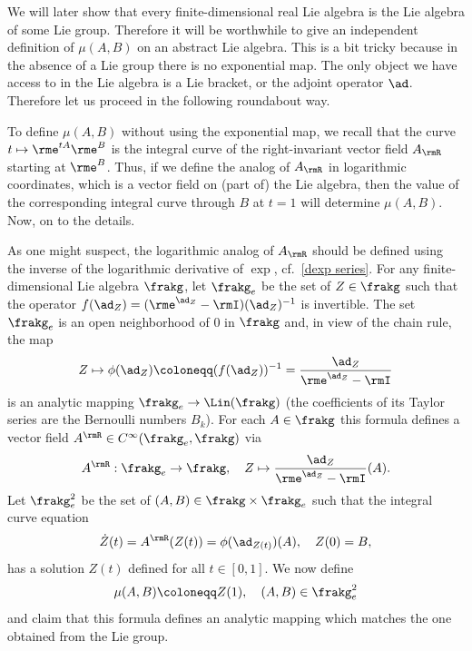 We will later show that every finite-dimensional real Lie algebra is the Lie algebra of some Lie group. Therefore it will be worthwhile to give an independent definition of $\mu(A,B)$ on an abstract Lie algebra. This is a bit tricky because in the absence of a Lie group there is no exponential map. The only object we have access to in the Lie algebra is a Lie bracket, or the adjoint operator $\ad$. Therefore let us proceed in the following roundabout way. 

To define $\mu(A,B)$ without using the exponential map, we recall that the curve $t\mapsto \rme^{tA}\rme^B$ is the integral curve of the right-invariant vector field $A_\rmR$ starting at $\rme^B$. Thus, if we define the analog of $A_\rmR$ in logarithmic coordinates, which is a vector field on (part of) the Lie algebra, then the value of the corresponding integral curve through $B$ at $t=1$ will determine $\mu(A,B)$. Now, on to the details.

As one might suspect, the logarithmic analog of $A_\rmR$ should be defined using the inverse of the logarithmic derivative of $\exp$, cf.\ \ref{dexp series}. For any finite-dimensional Lie algebra $\frakg$, let $\frakg_e$ be the set of $Z\in \frakg$ such that the operator $f(\ad_Z)=(\rme^{\ad_Z}-\rmI)(\ad_Z)^{-1}$ is invertible. The set $\frakg_e$ is an open neighborhood of $0$ in $\frakg$ and, in view of the chain rule, the map
\[Z\mapsto \phi(\ad_Z)\coloneqq (f(\ad_Z))^{-1}=\frac{\ad_Z}{\rme^{\ad_Z}-\rmI}\label{eq 1.6.1 DK}\]
is an analytic mapping $\frakg_e\to \Lin(\frakg)$ (the coefficients of its Taylor series are the Bernoulli numbers $B_k$). For each $A\in \frakg$ this formula defines a vector field $A^\rmR\in C^\infty(\frakg_e,\frakg)$ via
\[A^\rmR:\frakg_e\to \frakg,\quad Z\mapsto \frac{\ad_Z}{\rme^{\ad_Z}-\rmI}(A).\]
Let $\frakg_e^2$ be the set of $(A,B)\in \frakg\times\frakg_e$ such that the integral curve equation
\[\dot Z(t)=A^\rmR(Z(t))=\phi(\ad_{Z(t)})(A),\quad Z(0)=B,\label{eq Z(t)}\]
has a solution $Z(t)$ defined for all $t\in [0,1]$. We now define
\[\mu(A,B)\coloneqq Z(1),\quad (A,B)\in\frakg_e^2 \label{def local mu}\]
and claim that this formula defines an analytic mapping which matches the one obtained from the Lie group.


